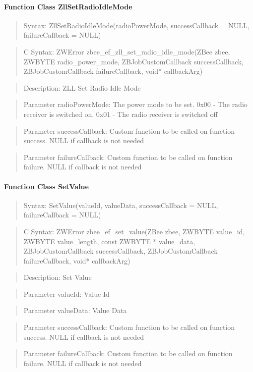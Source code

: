 \paragraph{Function Class ZllSetRadioIdleMode}
\begin{quote}Syntax: ZllSetRadioIdleMode(radioPowerMode, successCallback = NULL, failureCallback = NULL)\end{quote}
\begin{quote}C Syntax: ZWError zbee\_ef\_zll\_set\_radio\_idle\_mode(ZBee zbee, ZWBYTE radio\_power\_mode, ZBJobCustomCallback successCallback, ZBJobCustomCallback failureCallback, void* callbackArg)\end{quote}
\begin{quote}Description: ZLL Set Radio Idle Mode\end{quote}
\begin{quote}Parameter radioPowerMode: The power mode to be set. 0x00 - The radio receiver is switched on. 0x01 - The radio receiver is switched off\end{quote}
\begin{quote}Parameter successCallback: Custom function to be called on function success. NULL if callback is not needed\end{quote}
\begin{quote}Parameter failureCallback: Custom function to be called on function failure. NULL if callback is not needed\end{quote}


\paragraph{Function Class SetValue}
\begin{quote}Syntax: SetValue(valueId, valueData, successCallback = NULL, failureCallback = NULL)\end{quote}
\begin{quote}C Syntax: ZWError zbee\_ef\_set\_value(ZBee zbee, ZWBYTE value\_id, ZWBYTE value\_length, const ZWBYTE * value\_data, ZBJobCustomCallback successCallback, ZBJobCustomCallback failureCallback, void* callbackArg)\end{quote}
\begin{quote}Description: Set Value\end{quote}
\begin{quote}Parameter valueId: Value Id\end{quote}
\begin{quote}Parameter valueData: Value Data\end{quote}
\begin{quote}Parameter successCallback: Custom function to be called on function success. NULL if callback is not needed\end{quote}
\begin{quote}Parameter failureCallback: Custom function to be called on function failure. NULL if callback is not needed\end{quote}


